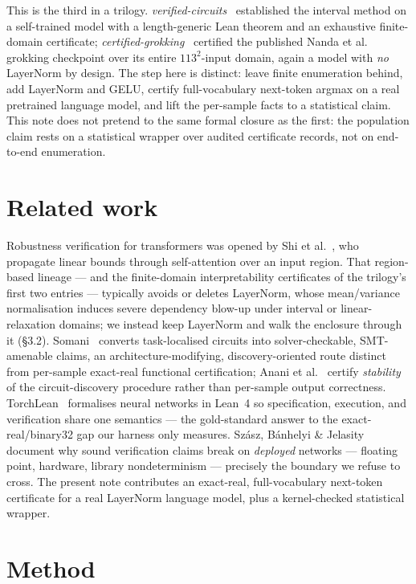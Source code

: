 \documentclass[11pt,a4paper]{article}
\begin{document}
This is the third in a trilogy. \emph{verified-circuits}~\cite{verifiedcircuits} established the interval method on a self-trained model with a length-generic Lean theorem and an exhaustive finite-domain certificate; \emph{certified-grokking}~\cite{certifiedgrokking} certified the published Nanda et al.~\cite{nanda2023} grokking checkpoint over its entire \(113^2\)-input domain, again a model with \emph{no} LayerNorm by design. The step here is distinct: leave finite enumeration behind, add LayerNorm and GELU, certify full-vocabulary next-token argmax on a real pretrained language model, and lift the per-sample facts to a statistical claim. This note does not pretend to the same formal closure as the first: the population claim rests on a statistical wrapper over audited certificate records, not on end-to-end enumeration.

\section{Related work}

Robustness verification for transformers was opened by Shi et al.~\cite{shi2020}, who propagate linear bounds through self-attention over an input region. That region-based lineage --- and the finite-domain interpretability certificates of the trilogy's first two entries --- typically avoids or deletes LayerNorm, whose mean/variance normalisation induces severe dependency blow-up under interval or linear-relaxation domains; we instead keep LayerNorm and walk the enclosure through it (\S3.2). Somani~\cite{somani2026} converts task-localised circuits into solver-checkable, SMT-amenable claims, an architecture-modifying, discovery-oriented route distinct from per-sample exact-real functional certification; Anani et al.~\cite{anani2026} certify \emph{stability} of the circuit-discovery procedure rather than per-sample output correctness. TorchLean~\cite{torchlean2026} formalises neural networks in Lean~4 so specification, execution, and verification share one semantics --- the gold-standard answer to the exact-real/binary32 gap our harness only measures. Szász, Bánhelyi \& Jelasity~\cite{szasz2025} document why sound verification claims break on \emph{deployed} networks --- floating point, hardware, library nondeterminism --- precisely the boundary we refuse to cross. The present note contributes an exact-real, full-vocabulary next-token certificate for a real LayerNorm language model, plus a kernel-checked statistical wrapper.

\section{Method}
\end{document}
